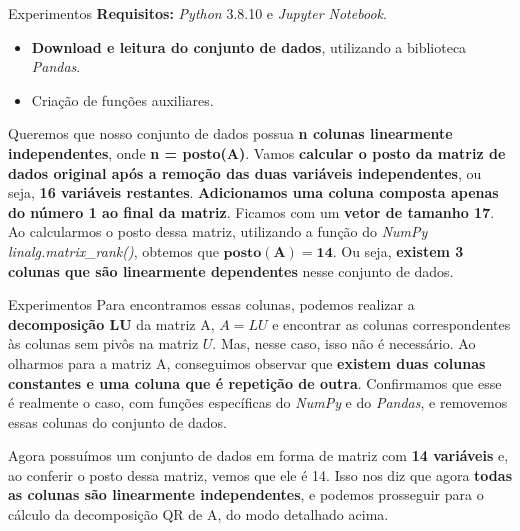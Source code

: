 \documentclass{beamer}
\theoremstyle{definition}
\begin{document}
\begin{frame}{Experimentos}
\justifying
\textbf{Requisitos:} \textit{Python} 3.8.10 e \textit{Jupyter Notebook}.

\begin{itemize}
    \item \textbf{Download e leitura do conjunto de dados}, utilizando a biblioteca \textit{Pandas}.
    \item Criação de funções auxiliares.
\end{itemize}
\pause

Queremos que nosso conjunto de dados possua \textbf{n colunas linearmente independentes}, onde \textbf{n = posto(A)}. Vamos \textbf{calcular o posto da matriz de dados original após a remoção das duas variáveis independentes}, ou seja,\textbf{ 16 variáveis restantes}. \textbf{Adicionamos uma coluna composta apenas do número 1 ao final da matriz}. Ficamos com um \textbf{vetor de tamanho 17}. Ao calcularmos o posto dessa matriz, utilizando a função do \textit{NumPy} \textit{linalg.matrix\_rank()}, obtemos que $\mathbf{posto(A) = 14}$. Ou seja, \textbf{existem 3 colunas que são linearmente dependentes} nesse conjunto de dados.

\end{frame}

\begin{frame}{Experimentos}
\justifying
Para encontramos essas colunas, podemos realizar a \textbf{decomposição LU} da matriz A, $A = LU$ e encontrar as colunas correspondentes às colunas sem pivôs na matriz $U$. Mas, nesse caso, isso não é necessário. Ao olharmos para a matriz A, conseguimos observar que \textbf{existem duas colunas constantes e uma coluna que é repetição de outra}. Confirmamos que esse é realmente o caso, com funções específicas do \textit{NumPy} e do \textit{Pandas}, e removemos essas colunas do conjunto de dados.
\newline\\
\pause

Agora possuímos um conjunto de dados em forma de matriz com \textbf{14 variáveis} e, ao conferir o posto dessa matriz, vemos que ele é 14. Isso nos diz que agora \textbf{todas as colunas são linearmente independentes}, e podemos prosseguir para o cálculo da decomposição QR de A, do modo detalhado acima.

\end{frame}
\end{document}
